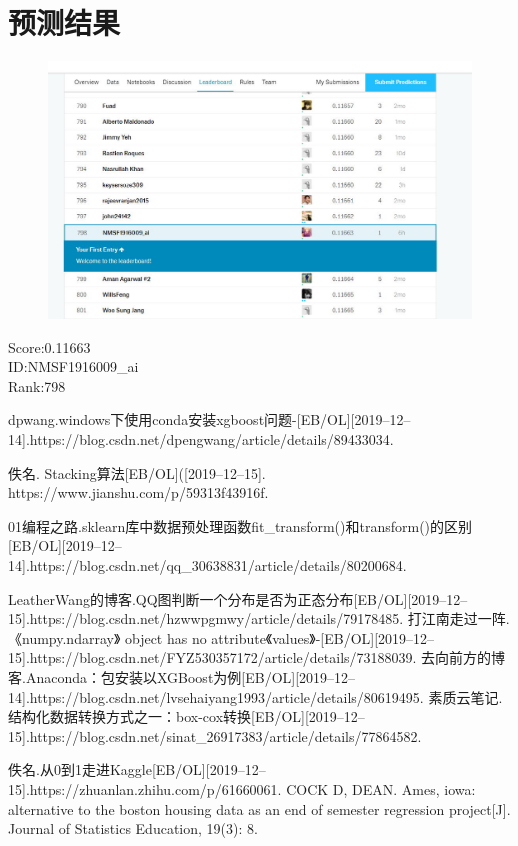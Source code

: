 \documentclass[no-math]{YangThesis}
\begin{document}
\section{预测结果}
\begin{figure}
	\centering
	\includegraphics[width=0.8\linewidth]{figure/deta}
	\caption[比赛排名]{}
	\label{fig:deta}
\end{figure}
Score:0.11663 \\
ID:NMSF1916009\_ai \\
Rank:798
\newpage
\begin{thebibliography}{9}
	
	
	dpwang.windows下使用conda安装xgboost问题-[EB/OL][2019–12–14].https://blog.csdn.net/dpengwang/article/details/89433034.
	
	 佚名. Stacking算法[EB/OL]([2019–12–15]. https://www.jianshu.com/p/59313f43916f.
	
	  01编程之路.sklearn库中数据预处理函数fit\_transform()和transform()的区别[EB/OL][2019–12–14].https://blog.csdn.net/qq\_30638831/article/details/80200684.
	
	 LeatherWang的博客.QQ图判断一个分布是否为正态分布[EB/OL][2019–12–15].https://blog.csdn.net/hzwwpgmwy/article/details/79178485.
	  打江南走过一阵. 《numpy.ndarray》 object has no attribute《values》-[EB/OL][2019–12–15].https://blog.csdn.net/FYZ530357172/article/details/73188039.
	去向前方的博客.Anaconda：包安装以XGBoost为例[EB/OL][2019–12–14].https://blog.csdn.net/lvsehaiyang1993/article/details/80619495.
	素质云笔记.结构化数据转换方式之一：box-cox转换[EB/OL][2019–12–15].https://blog.csdn.net/sinat\_26917383/article/details/77864582.
	
	 佚名.从0到1走进Kaggle[EB/OL][2019–12–15].https://zhuanlan.zhihu.com/p/61660061.
	 COCK D, DEAN. Ames, iowa: alternative to the boston housing data as an end of semester regression project[J]. Journal of Statistics Education, 19(3): 8.
\end{thebibliography}
\end{document}
